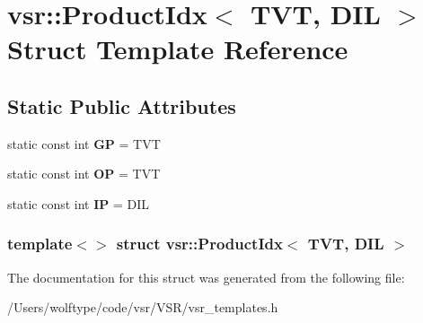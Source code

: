\hypertarget{structvsr_1_1_product_idx_3_01_t_v_t_00_01_d_i_l_01_4}{\section{vsr\-:\-:Product\-Idx$<$ T\-V\-T, D\-I\-L $>$ Struct Template Reference}
\label{structvsr_1_1_product_idx_3_01_t_v_t_00_01_d_i_l_01_4}
}
\subsection*{Static Public Attributes}
\begin{DoxyCompactItemize}
\item 
\hypertarget{structvsr_1_1_product_idx_3_01_t_v_t_00_01_d_i_l_01_4_a0bffcaad9655d129a11688d8b74684e2}{static const int {\bfseries G\-P} = T\-V\-T}\label{structvsr_1_1_product_idx_3_01_t_v_t_00_01_d_i_l_01_4_a0bffcaad9655d129a11688d8b74684e2}

\item 
\hypertarget{structvsr_1_1_product_idx_3_01_t_v_t_00_01_d_i_l_01_4_ada17088e0d396e774ba6753203ef4319}{static const int {\bfseries O\-P} = T\-V\-T}\label{structvsr_1_1_product_idx_3_01_t_v_t_00_01_d_i_l_01_4_ada17088e0d396e774ba6753203ef4319}

\item 
\hypertarget{structvsr_1_1_product_idx_3_01_t_v_t_00_01_d_i_l_01_4_a0d5ea3ab666ea2333bf0f870a99b6039}{static const int {\bfseries I\-P} = D\-I\-L}\label{structvsr_1_1_product_idx_3_01_t_v_t_00_01_d_i_l_01_4_a0d5ea3ab666ea2333bf0f870a99b6039}

\end{DoxyCompactItemize}
\subsubsection*{template$<$$>$ struct vsr\-::\-Product\-Idx$<$ T\-V\-T, D\-I\-L $>$}



The documentation for this struct was generated from the following file\-:\begin{DoxyCompactItemize}
\item 
/\-Users/wolftype/code/vsr/\-V\-S\-R/vsr\-\_\-templates.\-h\end{DoxyCompactItemize}
